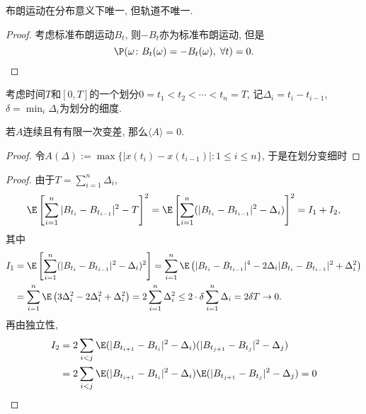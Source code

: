 \documentclass[a4paper, 10pt]{ctexart}
\begin{document}
\begin{theorem}
	布朗运动在分布意义下唯一, 但轨道不唯一. 
\end{theorem}
\begin{proof}
	考虑标准布朗运动$B_t$, 则$- B_t$亦为标准布朗运动, 但是
	\begin{equation*}
		\P(\omega \colon B_t(\omega) = -B_t(\omega), \; \forall t) = 0. 
	\end{equation*}
\end{proof}

\begin{definition}
	考虑时间$T$和$[0, T]$的一个划分$0 = t_1 < t_2 < \cdots < t_n = T$, 记$\Delta_i = t_{i} - t_{i-1}$, $\delta = \min_i \Delta_i$为划分的细度. 
\end{definition}

\begin{lemma}
	若$A$连续且有有限一次变差, 那么$\langle A \rangle = 0$. 
\end{lemma}
\begin{proof}
	令$A(\Delta) := \max \{|x(t_i) - x(t_{i-1})| \colon 1 \leq i \leq n \}$, 于是在划分变细时
\end{proof}

\begin{theorem}[平方变差]
	
\end{theorem}

\begin{proof}
	由于$T = \sum_{i=1}^{n} \Delta_i$, 
	\begin{equation*}
		\E \left[ \sum_{i=1}^n |B_{t_i} - B_{t_{i-1}}|^2 - T \right]^2
		= \E \left[ \sum_{i=1}^n (|B_{t_i} - B_{t_{i-1}}|^2 - \Delta_i) \right]^2 
		= I_1 + I_2, 
	\end{equation*}
	其中
	\begin{align*}
		I_1 
		&= \E \left[ \sum_{i=1}^n (|B_{t_i} - B_{t_{i-1}}|^2 - \Delta_i)^2 \right]
		= \sum_{i=1}^n \E \left(|B_{t_i} - B_{t_{i-1}}|^4 - 2 \Delta_i |B_{t_i} - B_{t_{i-1}}|^2 + \Delta_i^2 \right) \\
		&= \sum_{i=1}^n \E \left(3 \Delta_i^2 - 2 \Delta_i^2 + \Delta_i^2 \right)
		= 2 \sum_{i=1}^n \Delta_i^2 
		\leq 2 \cdot \delta \sum_{i=1}^n \Delta_i
		= 2 \delta T \to 0. 
	\end{align*}
	再由独立性, 
	\begin{align*}
		I_2 
		&= 2 \sum_{i < j} \E(|B_{t_{i + 1}} - B_{t_i}|^2 - \Delta_i)(|B_{t_{j + 1}} - B_{t_j}|^2 - \Delta_j)\\
		&= 2 \sum_{i < j} \E(|B_{t_{i + 1}} - B_{t_i}|^2 - \Delta_i) \E(|B_{t_{j + 1}} - B_{t_j}|^2 - \Delta_j)
		= 0
	\end{align*}
\end{proof}
\end{document}
